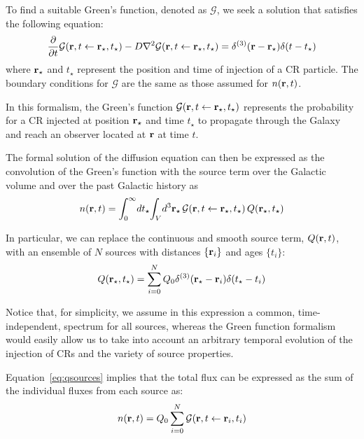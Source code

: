 To find a suitable Green's function, denoted as $\mathcal{G}$, we seek a solution that satisfies the following equation:
%
\begin{equation}
\frac{\partial}{\partial t} \mathcal G(\vb r, t \leftarrow \vb r_\star, t_\star) 
- D \nabla^2 \mathcal G(\vb r, t \leftarrow \vb r_\star, t_\star) 
= \delta^{(3)}(\vb r - \vb r_\star) \delta(t - t_\star)
\end{equation}
%
where $\vb r_\star$ and $t_\star$ represent the position and time of injection of a CR particle. The boundary conditions for $\mathcal{G}$ are the same as those assumed for $n(\vb r, t)$.

In this formalism, the Green's function $\mathcal{G}(\vb r, t \leftarrow \vb r_\star, t_\star)$ represents the probability for a CR injected at position $\vb r_\star$ and time $t_\star$ to propagate through the Galaxy and reach an observer located at $\vb r$ at time $t$.

The formal solution of the diffusion equation can then be expressed as the convolution of the Green's function with the source term over the Galactic volume and over the past Galactic history as
%
\begin{equation}
n(\vb r, t) = \int_0^{\infty} \! dt_\star \! \int_{V} \!  d^3 \vb r_\star \, \mathcal G(\vb r, t \leftarrow \vb r_\star, t_\star) \, Q(\vb r_\star, t_\star)
\label{eq:greenconv}
\end{equation}

In particular, we can replace the continuous and smooth source term, $Q(\vb r, t)$, with an ensemble of $N$ sources with distances $\{ \vb r_i \}$ and ages $\{ t_i \}$: 
%
\begin{equation}
Q(\vb r_\star, t_\star) = \sum_{i=0}^N Q_0 \delta^{(3)}(\vb r_\star - \vb r_i) \delta(t_\star - t_i)
\label{eq:qsources}
\end{equation}

Notice that, for simplicity, we assume in this expression a common, time-independent, spectrum for all sources, whereas the Green function formalism would easily allow us to take into account an arbitrary temporal evolution of the injection of CRs and the variety of source properties.

Equation~\eqref{eq:qsources} implies that the total flux can be expressed as the sum of the individual fluxes from each source as:
%
\begin{equation}
n(\vb r, t) = Q_0 \sum_{i=0}^N \mathcal G(\vb r, t \leftarrow \vb r_i, t_i)
\end{equation}

